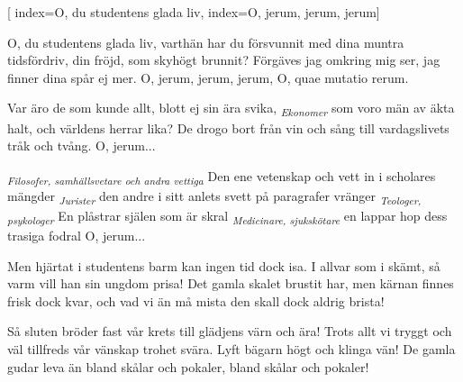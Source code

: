 [
	index={O, du studentens glada liv},
	index={O, jerum, jerum, jerum}]

\beginverse* 
O, du studentens glada liv,
varthän har du försvunnit
med dina muntra tidsfördriv,
din fröjd, som skyhögt brunnit?
Förgäves jag omkring mig ser,
jag finner dina spår ej mer.
\endverse
\beginchorus
O, jerum, jerum, jerum,
O, quae mutatio rerum.
\endchorus

Var äro de som kunde allt,
blott ej sin ära svika,
{\textsubscript{\textit{\tiny{Ekonomer}}}}
som voro män av äkta halt,
och världens herrar lika?
De drogo bort från vin och sång
till vardagslivets tråk och tvång.
\endverse
\beginchorus
O, jerum...
\endchorus

\beginverse* 
\textsubscript{\textit{\tiny{Filosofer, samhällsvetare och andra vettiga}}}
Den ene vetenskap och vett
in i scholares mängder
\textsubscript{\textit{\tiny{Jurister}}}
den andre i sitt anlets svett
på paragrafer vränger
\textsubscript{\textit{\tiny{Teologer, psykologer}}}
En plåstrar själen som är skral
\textsubscript{\textit{\tiny{Medicinare, sjukskötare}}}
en lappar hop dess trasiga fodral
\endverse
\beginchorus
O, jerum...
\endchorus

\beginverse* 
Men hjärtat i studentens barm
kan ingen tid dock isa.
I allvar som i skämt, så varm
vill han sin ungdom prisa!
Det gamla skalet brustit har,
men kärnan finnes frisk dock kvar,
\endverse
\beginchorus
och vad vi än må mista
den skall dock aldrig brista!
\endchorus

\beginverse* 
Så sluten bröder fast vår krets
till glädjens värn och ära!
Trots allt vi tryggt och väl tillfreds
vår vänskap trohet svära.
Lyft bägarn högt och klinga vän!
De gamla gudar leva än 
\endverse
\beginchorus
bland skålar och pokaler,
bland skålar och pokaler!
\endchorus
\endsong


